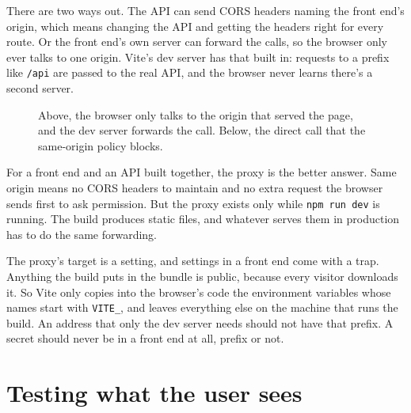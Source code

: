 There are two ways out. The API can send CORS headers naming the front end's
origin, which means changing the API and getting the headers right for every
route. Or the front end's own server can forward the calls, so the browser
only ever talks to one origin. Vite's dev server has that built in: requests to
a prefix like \texttt{/api} are passed to the real API, and the browser never
learns there's a second server.

\begin{figure}[htbp]
\centering
{}
\caption{Above, the browser only talks to the origin that served the page, and
the dev server forwards the call. Below, the direct call that the same-origin
policy blocks.}
\end{figure}

For a front end and an API built together, the proxy is the better answer. Same
origin means no CORS headers to maintain and no extra request the browser sends
first to ask permission. But the proxy exists only while \texttt{npm run dev} is
running. The build produces static files, and whatever serves them in
production has to do the same forwarding.

The proxy's target is a setting, and settings in a front end come with a trap.
Anything the build puts in the bundle is public, because every visitor downloads
it. So Vite only copies into the browser's code the environment variables whose
names start with \texttt{VITE\_}, and leaves everything else on the machine that
runs the build. An address that only the dev server needs should not have that
prefix. A secret should never be in a front end at all, prefix or not.

\section{Testing what the user sees}

